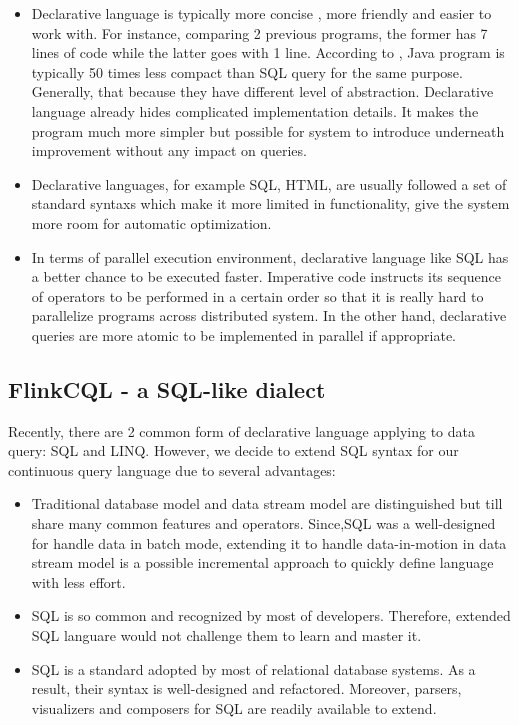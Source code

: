 \begin{itemize}
	\item Declarative language is typically more concise , more friendly and easier to work with. For instance, comparing 2 previous programs, the former has 7 lines of code while the latter goes with 1 line. According to \citep{Ronnie:2015}, Java program is typically 50 times less compact than SQL query for the same purpose. Generally, that because they have different level of abstraction. Declarative language already hides complicated implementation details. It makes the program much more simpler but possible for system to introduce underneath improvement without any impact on queries.
	\item Declarative languages, for example SQL, HTML,  are usually followed a set of standard syntaxs which make it more limited in functionality, give the system more room for automatic optimization. 
	\item In terms of parallel execution environment, declarative language like SQL has a better chance to be executed faster. Imperative code instructs its sequence of operators to be performed in a certain order so that it is really hard to parallelize programs across distributed system. In the other hand, declarative queries are more atomic to be implemented in parallel if appropriate.
\end{itemize}

\subsection*{FlinkCQL - a SQL-like dialect}
Recently, there are 2 common form of declarative language applying to data query: SQL and LINQ. However, we decide to extend SQL syntax for our continuous query language due to several advantages:
\begin{itemize}
	\item Traditional database model and data stream model are distinguished but till share many common features and operators. Since,SQL was a well-designed for handle data in batch mode, extending it to handle data-in-motion in data stream model is a possible incremental approach to quickly define language with less effort.
	\item SQL is so common and recognized by most of developers. Therefore, extended SQL languare would not challenge them to learn and master it.
	\item SQL is a standard adopted by most of relational database systems. As a result, their syntax is well-designed and refactored. Moreover, parsers, visualizers and composers for SQL are readily available to extend.
\end{itemize}

